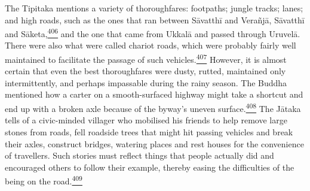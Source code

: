 The Tipitaka mentions a variety of thoroughfares: footpaths; jungle
tracks; lanes; and high roads, such as the ones that ran between
Sāvatthī and Verañjā, Sāvatthī and
Sāketa,\label{footprints_split_012.html_fnref406}\hyperref[footprints_split_024.htmlux5cux23fn406]{\textsuperscript{406}}
and the one that came from Ukkalā and passed through Uruvelā. There were
also what were called chariot roads, which were probably fairly well
maintained to facilitate the passage of such
vehicles.\label{footprints_split_012.html_fnref407}\hyperref[footprints_split_024.htmlux5cux23fn407]{\textsuperscript{407}}
However, it is almost certain that even the best thoroughfares were
dusty, rutted, maintained only intermittently, and perhaps impassable
during the rainy season. The Buddha mentioned how a carter on a
smooth-surfaced highway might take a shortcut and end up with a broken
axle because of the byway's uneven
surface.\label{footprints_split_012.html_fnref408}\hyperref[footprints_split_025.htmlux5cux23fn408]{\textsuperscript{408}}
The Jātaka tells of a civic-minded villager who mobilised his friends to
help remove large stones from roads, fell roadside trees that might hit
passing vehicles and break their axles, construct bridges, watering
places and rest houses for the convenience of travellers. Such stories
must reflect things that people actually did and encouraged others to
follow their example, thereby easing the difficulties of the being on
the
road.\label{footprints_split_012.html_fnref409}\hyperref[footprints_split_025.htmlux5cux23fn409]{\textsuperscript{409}}


